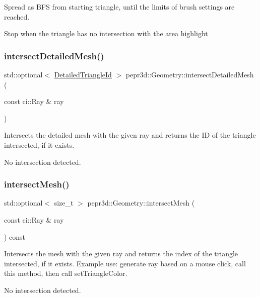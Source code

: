 Spread as B\+FS from starting triangle, until the limits of brush settings are reached. 

Stop when the triangle has no intersection with the area highlight \mbox{\label{classpepr3d_1_1_geometry_ae68a633ab4ab435156e0b03e64c9ede9}} 
\subsubsection{\texorpdfstring{intersectDetailedMesh()}{intersectDetailedMesh()}}
{\footnotesize\ttfamily std\+::optional$<$ \mbox{\hyperlink{structpepr3d_1_1_detailed_triangle_id}{Detailed\+Triangle\+Id}} $>$ pepr3d\+::\+Geometry\+::intersect\+Detailed\+Mesh (\begin{DoxyParamCaption}\item[{const ci\+::\+Ray \&}]{ray }\end{DoxyParamCaption})}



Intersects the detailed mesh with the given ray and returns the ID of the triangle intersected, if it exists. 

No intersection detected. \mbox{\label{classpepr3d_1_1_geometry_ace58dc7a4182240000e9b773cb8da4ee}} 
\subsubsection{\texorpdfstring{intersectMesh()}{intersectMesh()}}
{\footnotesize\ttfamily std\+::optional$<$ size\+\_\+t $>$ pepr3d\+::\+Geometry\+::intersect\+Mesh (\begin{DoxyParamCaption}\item[{const ci\+::\+Ray \&}]{ray }\end{DoxyParamCaption}) const}



Intersects the mesh with the given ray and returns the index of the triangle intersected, if it exists. Example use\+: generate ray based on a mouse click, call this method, then call set\+Triangle\+Color. 

No intersection detected. \mbox{\label{classpepr3d_1_1_geometry_a027715ec109b060ffc8b420947c4fde0}} 
